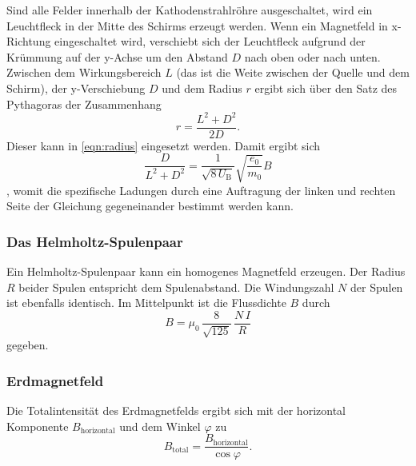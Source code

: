 Sind alle Felder innerhalb der Kathodenstrahlröhre ausgeschaltet, wird ein Leuchtfleck in der Mitte des Schirms erzeugt werden.  
Wenn ein Magnetfeld in x-Richtung eingeschaltet wird, verschiebt sich 
der Leuchtfleck aufgrund der Krümmung auf der y-Achse 
um den Abstand $D$ nach oben oder nach unten. Zwischen dem Wirkungsbereich $L$ (das ist die Weite 
zwischen der Quelle und dem Schirm), der y-Verschiebung  $D$ und dem 
Radius $r$ ergibt sich über den Satz des Pythagoras der Zusammenhang 
\begin{equation*}
    r = \frac{L^2 + D^2}{2D}.
\end{equation*}
Dieser kann in \eqref{eqn:radius} eingesetzt werden.
Damit ergibt sich  
\begin{equation}
    \frac{D}{L^2 + D^2}= \frac{1}{\sqrt{8 \, U_\text{B}}}\sqrt{\frac{e_\text{0}}{m_\text{0}}} B
    \label{eqn:Ende}
\end{equation}, 
womit die spezifische Ladungen durch eine Auftragung der linken und rechten Seite der Gleichung gegeneinander bestimmt werden kann. 

\subsubsection{Das Helmholtz-Spulenpaar}
Ein Helmholtz-Spulenpaar kann ein homogenes Magnetfeld erzeugen.
Der Radius $R$ beider Spulen entspricht dem Spulenabstand.
Die Windungszahl $N$ der Spulen ist ebenfalls identisch.
Im Mittelpunkt ist die Flussdichte $B$ durch
\begin{equation}
    B = \mu_0 \, \frac{8}{\sqrt{125}} \, \frac{N \, I}{R}
    \label{eqn:helmholtz}
\end{equation}
gegeben.

\subsubsection{Erdmagnetfeld}
Die Totalintensität des Erdmagnetfelds ergibt sich mit der horizontal Komponente $B_\text{horizontal}$ und dem Winkel $\varphi$ zu %
\begin{equation}
    B_\text{total} = \frac{B_\text{horizontal}}{\cos{\varphi}}.
    \label{eqn:btotal}
\end{equation}
